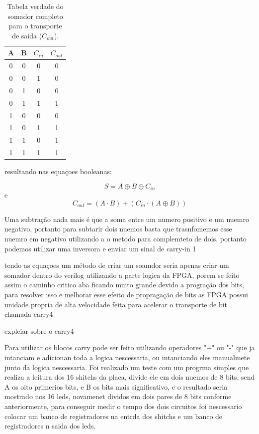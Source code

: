 \begin{table}[htb]
\centering
\caption{Tabela verdade do somador completo para o transporte de saída ($C_{out}$).}
\label{tab:fa_cout}
\begin{tabular}{cccc}
\toprule
\textbf{A} & \textbf{B} & \textbf{$C_{in}$} & \textbf{$C_{out}$} \\
\midrule
0 & 0 & 0 & 0 \\
0 & 0 & 1 & 0 \\
0 & 1 & 0 & 0 \\
0 & 1 & 1 & 1 \\
1 & 0 & 0 & 0 \\
1 & 0 & 1 & 1 \\
1 & 1 & 0 & 1 \\
1 & 1 & 1 & 1 \\
\bottomrule
\end{tabular}
\end{table}

resultando nas equaçoes booleanas:

$$S = A \oplus B \oplus C_{in}$$
e
$$C_{out} = (A \cdot B) + (C_{in} \cdot (A \oplus B))$$

Uma subtração nada mais é que a soma entre um numero positivo e um nuemro negativo, portanto para subtarir dois nuemos basta que trasnfomemos esse nuemro em negativo utilizando a o metodo para complemteto de dois, portanto podemos utilizar uma inversora e enviar um sinal de carry-in 1

tendo as equaçoes um método de criar um soamdor seria apenas criar um somador dentro do verilog utilizando a parte logica da FPGA, porem se feito assim o caminho critico aba ficando muito grande devido a progração dos bits, para resolver isso e melhorar esse efeito de propragação de bits as FPGA possui unidade propria de alta velocidade feita para acelerar o transporte de bit chamada carry4

explciar sobre o carry4

Para utilizar os blocos carry pode ser feito utilizando operadores "+" ou "-" que ja intanciam e adicionan toda a logica nescessaria, ou intanciando eles manualmete junto da logica nescessaria. Foi realizado um teste com um progrma simples que realiza a leitura dos 16 shitchs da placa, divide ele em dois nuemos de 8 bits, send A os oito primerios bits, e B os bits mais significativo, e o resultado seria mostrado nos 16 leds, novamenet dividos em dois pares de 8 bits conforme anteriormente, para conseguir medir o tempo dos dois circuitos foi nescessario colocar um banco de registradores na entrda dos shitchs e um banco de registradores n saida dos leds.

